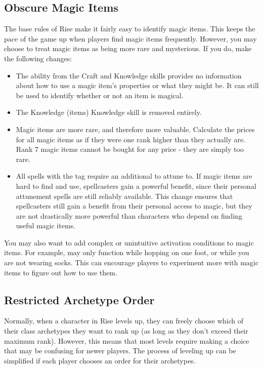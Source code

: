    \subsection{Obscure Magic Items}\label{Obscure Magic Items}
        The base rules of Rise make it fairly easy to identify magic items.
        This keeps the pace of the game up when players find magic items frequently.
        However, you may choose to treat magic items as being more rare and mysterious.
        If you do, make the following changes:
        \begin{itemize}
            \item The  ability from the Craft and Knowledge skills provides no information about how to use a magic item's properties or what they might be.
                It can still be used to identify whether or not an item is magical.
            \item The Knowledge (items) Knowledge skill is removed entirely.
            \item Magic items are more rare, and therefore more valuable.
                Calculate the prices for all magic items as if they were one rank higher than they actually are.
                Rank 7 magic items cannot be bought for any price - they are simply too rare.
            \item All spells with the  tag require an additional  to attune to.
                If magic items are hard to find and use, spellcasters gain a powerful benefit, since their personal attunement spells are still reliably available.
                This change ensures that spellcasters still gain a benefit from their personal access to magic, but they are not drastically more powerful than characters who depend on finding useful magic items.
        \end{itemize}

        You may also want to add complex or unintuitive activation conditions to magic items.
        For example,  may only function while hopping on one foot, or while you are not wearing socks.
        This can encourage players to experiment more with magic items to figure out how to use them.

    \subsection{Restricted Archetype Order}
        Normally, when a character in Rise levels up, they can freely choose which of their class archetypes they want to rank up (as long as they don't exceed their maximum rank).
        However, this means that most levels require making a choice that may be confusing for newer players.
        The process of leveling up can be simplified if each player chooses an order for their archetypes.

